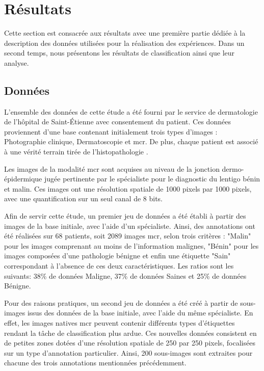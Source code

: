 \documentclass{gretsi}
\begin{document}
\begin{sloppypar}
\section{Résultats}
\label{resultat}
Cette section est consacrée aux résultats avec une première partie dédiée à la description des données utilisées pour la réalisation des expériences. Dans un second temps, nous présentons les résultats de classification ainsi que leur analyse.

\subsection{Données}
L'ensemble des données de cette étude a été fourni par le service de dermatologie de l'hôpital de Saint-Étienne avec consentement du patient. Ces données proviennent d'une base contenant initialement trois types d’images : Photographie clinique, Dermatoscopie et \ac{mcr}. De plus, chaque patient est associé à une vérité terrain tirée de l’histopathologie \cite{Cinotti2018}.\par
Les images de la modalité \ac{mcr} sont acquises au niveau de la jonction dermo-épidermique jugée pertinente par le spécialiste pour le diagnostic du lentigo bénin et malin. Ces images ont une résolution spatiale de 1000 pixels par 1000 pixels, avec une quantification sur un seul canal de 8 bits.\par
Afin de servir cette étude, un premier jeu de données a été établi à partir des images de la base initiale, avec l’aide d’un spécialiste. Ainsi, des annotations ont été réalisées sur 68 patients, soit 2089 images \ac{mcr}, selon trois critères : "Malin" pour les images comprenant au moins de l'information malignes, "Bénin" pour les images composées d'une pathologie bénigne et enfin une étiquette "Sain" correspondant à l'absence de ces deux caractéristiques. Les ratios sont les suivants: 38\% de données Maligne, 37\% de données Saines et 25\% de données Bénigne.\par
Pour des raisons pratiques, un second jeu de données a été créé à partir de sous-images issus des données de la base initiale, avec l'aide du même spécialiste. En effet, les images natives \ac{mcr} peuvent contenir différents types d'étiquettes rendant la tâche de classification plus ardue. Ces nouvelles données consistent en de petites zones dotées d'une résolution spatiale de 250 par 250 pixels, focalisées sur un type d'annotation particulier. Ainsi, 200 sous-images sont extraites pour chacune des trois annotations mentionnées précédemment.\par

\end{sloppypar}
\end{document}
